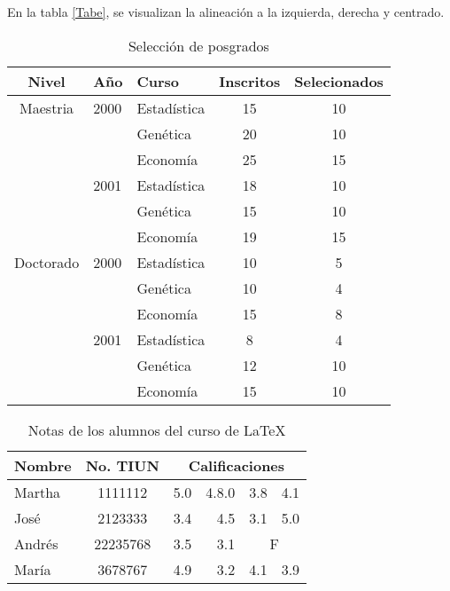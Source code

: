 \documentclass{article}
\begin{document}
En la tabla \ref{Tabe}, se visualizan la alineación a la izquierda, derecha y centrado.

\def\tablename{Tabela}%
\begin{table}[ht!]
\centering
\caption{Selección de posgrados} \vspace*{0.3cm}
\begin{tabular}{c|l|l|c|c} \hline
Nivel & Año & Curso & Inscritos & Selecionados \\ \hline
Maestria & 2000 & Estadística & 15 & 10 \\ \cline{3-5}
& & Genética & 20 & 10 \\ \cline{3-5}
& & Economía & 25 & 15 \\ \cline{2-5}
& 2001 & Estadística & 18 & 10 \\ \cline{3-5}
& & Genética & 15 & 10 \\ \cline{3-5}
& & Economía & 19 & 15 \\ \hline
Doctorado & 2000 & Estadística & 10 & 5 \\ \cline{3-5}
& & Genética & 10 & 4 \\ \cline{3-5}
& & Economía & 15 & 8 \\ \cline{2-5}
& 2001 & Estadística & 8 & 4 \\ \cline{3-5}
& & Genética & 12 & 10 \\ \cline{3-5}
& & Economía & 15 & 10 \\ \hline
\end{tabular}
\end{table}

\def\tablename{Tabela}%
\begin{table}[!htb]
\centering
\caption{Notas de los alumnos del curso de \LaTeX } \vspace*{0.3cm}
\large
\begin{tabular}{l|c|rrrr} \hline
Nombre & No. TIUN  & \multicolumn{4}{c}{Calificaciones} \\ \hline
Martha & 1111112 & 5.0 & 4.8.0 & 3.8 & 4.1 \\
José & 2123333   & 3.4 & 4.5 & 3.1 & 5.0 \\
Andrés & 22235768 & 3.5 & 3.1 & \multicolumn{2}{c}{F} \\
María & 3678767 & 4.9 & 3.2& 4.1 & 3.9 \\ \hline
\end{tabular}
\end{table}
\end{document}
